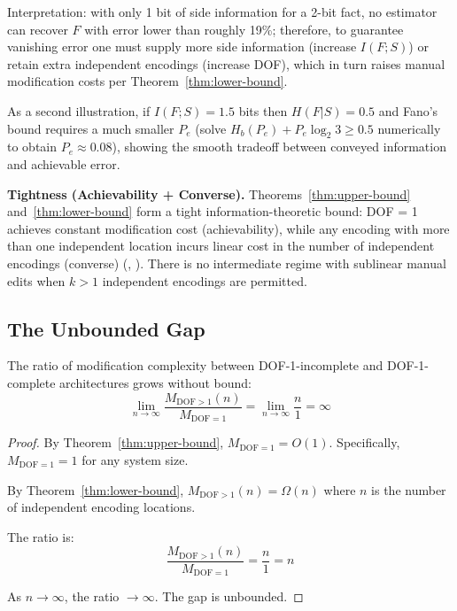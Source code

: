 Interpretation: with only 1 bit of side information for a 2-bit fact, no estimator can recover $F$ with error lower than roughly 19\%; therefore, to guarantee vanishing error one must supply more side information (increase $I(F;S)$) or retain extra independent encodings (increase DOF), which in turn raises manual modification costs per Theorem~\ref{thm:lower-bound}.

As a second illustration, if $I(F;S)=1.5$ bits then $H(F|S)=0.5$ and Fano's bound requires a much smaller $P_e$ (solve $H_b(P_e)+P_e\log_2 3\ge 0.5$ numerically to obtain $P_e\approx 0.08$), showing the smooth tradeoff between conveyed information and achievable error.



\textbf{Tightness (Achievability + Converse).} Theorems~\ref{thm:upper-bound} and~\ref{thm:lower-bound} form a tight information-theoretic bound: DOF = 1 achieves constant modification cost (achievability), while any encoding with more than one independent location incurs linear cost in the number of independent encodings (converse) (, ). There is no intermediate regime with sublinear manual edits when $k > 1$ independent encodings are permitted.

\subsection{The Unbounded Gap}\label{sec:gap}

\begin{theorem}\label{thm:unbounded-gap}
The ratio of modification complexity between DOF-1-incomplete and DOF-1-complete architectures grows without bound:
\[
\lim_{n \to \infty} \frac{M_{\text{DOF}>1}(n)}{M_{\text{DOF}=1}} = \lim_{n \to \infty} \frac{n}{1} = \infty
\]
\end{theorem}

\begin{proof}
By Theorem~\ref{thm:upper-bound}, $M_{\text{DOF}=1} = O(1)$. Specifically, $M_{\text{DOF}=1} = 1$ for any system size.

By Theorem~\ref{thm:lower-bound}, $M_{\text{DOF}>1}(n) = \Omega(n)$ where $n$ is the number of independent encoding locations.

The ratio is:
\[
\frac{M_{\text{DOF}>1}(n)}{M_{\text{DOF}=1}} = \frac{n}{1} = n
\]

As $n \to \infty$, the ratio $\to \infty$. The gap is unbounded.
\end{proof}

